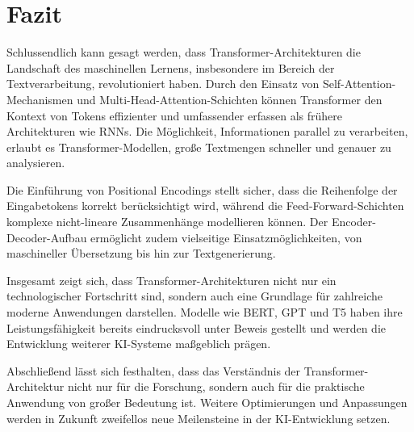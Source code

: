 \chapter{Fazit}

Schlussendlich kann gesagt werden, dass Transformer-Architekturen die Landschaft des maschinellen Lernens, insbesondere im Bereich der Textverarbeitung, revolutioniert haben. 
Durch den Einsatz von Self-Attention-Mechanismen und Multi-Head-Attention-Schichten können Transformer den Kontext von Tokens effizienter und umfassender erfassen als frühere Architekturen wie RNNs. 
Die Möglichkeit, Informationen parallel zu verarbeiten, erlaubt es Transformer-Modellen, große Textmengen schneller und genauer zu analysieren.

Die Einführung von Positional Encodings stellt sicher, dass die Reihenfolge der Eingabetokens korrekt berücksichtigt wird, während die Feed-Forward-Schichten komplexe nicht-lineare Zusammenhänge modellieren können. 
Der Encoder-Decoder-Aufbau ermöglicht zudem vielseitige Einsatzmöglichkeiten, von maschineller Übersetzung bis hin zur Textgenerierung.

Insgesamt zeigt sich, dass Transformer-Architekturen nicht nur ein technologischer Fortschritt sind, sondern auch eine Grundlage für zahlreiche moderne Anwendungen darstellen. 
Modelle wie BERT, GPT und T5 haben ihre Leistungsfähigkeit bereits eindrucksvoll unter Beweis gestellt und werden die Entwicklung weiterer KI-Systeme maßgeblich prägen.

Abschließend lässt sich festhalten, dass das Verständnis der Transformer-Architektur nicht nur für die Forschung, sondern auch für die praktische Anwendung von großer Bedeutung ist. 
Weitere Optimierungen und Anpassungen werden in Zukunft zweifellos neue Meilensteine in der KI-Entwicklung setzen.
